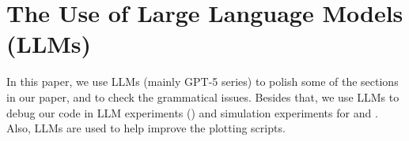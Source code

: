 \section{The Use of Large Language Models (LLMs)}
In this paper, we use LLMs (mainly GPT-5 series) to polish some of the sections in our paper, and to check the grammatical issues. Besides that, we use LLMs to debug our code in LLM experiments () and simulation experiments for   and . Also, LLMs are used to help improve the plotting scripts.
